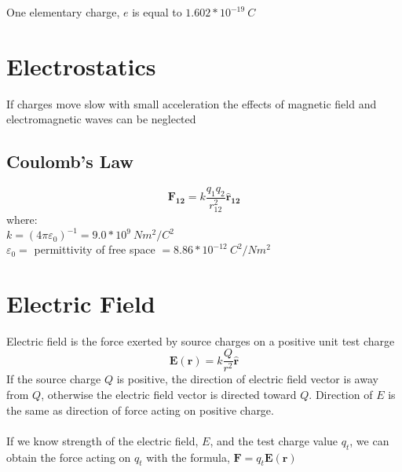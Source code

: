 \documentclass{article}
\begin{document}
One elementary charge, $e$ is equal to $1.602*10^{-19} \: C$

\section*{Electrostatics}

If charges move slow with small acceleration the effects of magnetic field and electromagnetic
waves can be neglected
\subsection*{Coulomb's Law}
\[\pmb{F_{12}}=k\frac{q_1 q_2}{r_{12}^2}\pmb{\hat{r}_{12}}\]
where: \\
$k={(4\pi\varepsilon_0)}^{-1}=9.0*10^9 \: N m^2 / C^2$ \\
$\varepsilon_0=$ permittivity of free space $= 8.86 * 10^{-12} \: C^2 / N m^2$

\section*{Electric Field}
Electric field is the force exerted by source charges on a positive unit test charge
\[\pmb{E(r)}=k\frac{Q}{r^2}\pmb{\hat{r}}\]
If the source charge $Q$ is positive, the direction of electric field vector is away from $Q$,
otherwise the electric field vector is directed toward $Q$. Direction of $E$ is the same as
direction of force acting on positive charge. \\ \\
If we know strength of the electric field, $E$, and the test charge value $q_t$, we can obtain the
force acting on $q_t$ with the formula, $\pmb{F} = q_t \pmb{E(r)}$
\end{document}
